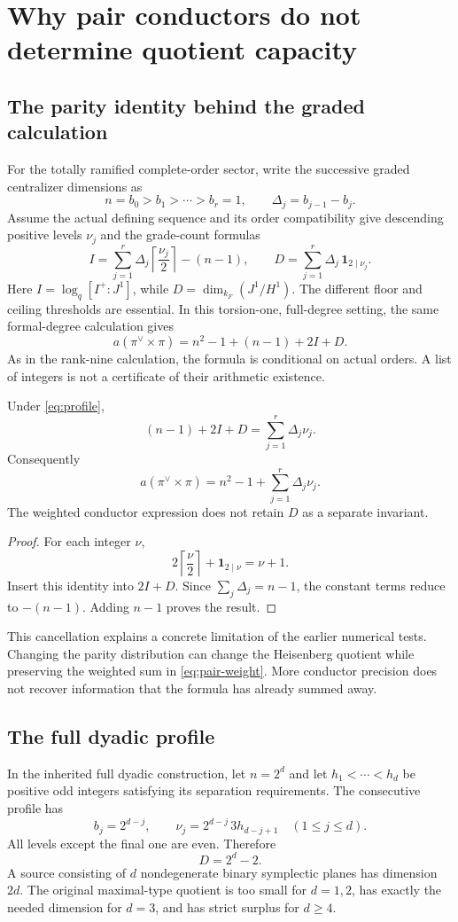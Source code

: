 \section{Why pair conductors do not determine quotient capacity}\label{sec:profiles}
\subsection{The parity identity behind the graded calculation}
For the totally ramified complete-order sector, write the successive graded centralizer dimensions as
\[
 n=b_0>b_1>\cdots>b_r=1,
 \qquad \Delta_j=b_{j-1}-b_j.
\]
Assume the actual defining sequence and its order compatibility give descending positive levels $\nu_j$ and the grade-count formulas
\[
 I=\sum_{j=1}^r\Delta_j\left\lceil\frac{\nu_j}{2}\right\rceil-(n-1),
 \qquad
 D=\sum_{j=1}^r\Delta_j\,\mathbf1_{2\mid\nu_j}.
 \tag{24.1}\label{eq:profile}
\]
Here $I=\log_q[I^+:J^1]$, while $D=\dim_{k_F}(J^1/H^1)$. The different floor and ceiling thresholds are essential. In this torsion-one, full-degree setting, the same formal-degree calculation gives
\[
 a(\pi^\vee\times\pi)=n^2-1+(n-1)+2I+D.
 \tag{24.2}\label{eq:pair-profile}
\]
As in the rank-nine calculation, the formula is conditional on actual orders. A list of integers is not a certificate of their arithmetic existence.

\begin{proposition}\label{prop:parity}
Under \eqref{eq:profile},
\[
 (n-1)+2I+D=\sum_{j=1}^r\Delta_j\nu_j.
\]
Consequently
\[
 a(\pi^\vee\times\pi)=n^2-1+\sum_{j=1}^r\Delta_j\nu_j.
 \tag{24.3}\label{eq:pair-weight}
\]
The weighted conductor expression does not retain $D$ as a separate invariant.
\end{proposition}
\begin{proof}
For each integer $\nu$,
\[
 2\left\lceil\frac{\nu}{2}\right\rceil+
 \mathbf1_{2\mid\nu}=\nu+1.
\]
Insert this identity into $2I+D$. Since $\sum_j\Delta_j=n-1$, the constant terms reduce to $-(n-1)$. Adding $n-1$ proves the result.
\end{proof}

This cancellation explains a concrete limitation of the earlier numerical tests. Changing the parity distribution can change the Heisenberg quotient while preserving the weighted sum in \eqref{eq:pair-weight}. More conductor precision does not recover information that the formula has already summed away.

\subsection{The full dyadic profile}
In the inherited full dyadic construction, let $n=2^d$ and let $h_1<\cdots<h_d$ be positive odd integers satisfying its separation requirements. The consecutive profile has
\[
 b_j=2^{d-j},\qquad
 \nu_j=2^{d-j}\,3h_{d-j+1}
 \quad(1\le j\le d).
 \tag{24.4}\label{eq:dyadic-profile}
\]
All levels except the final one are even. Therefore
\[
 D=2^d-2.
 \tag{24.5}\label{eq:dyadic-D}
\]
A source consisting of $d$ nondegenerate binary symplectic planes has dimension $2d$. The original maximal-type quotient is too small for $d=1,2$, has exactly the needed dimension for $d=3$, and has strict surplus for $d\ge4$.

